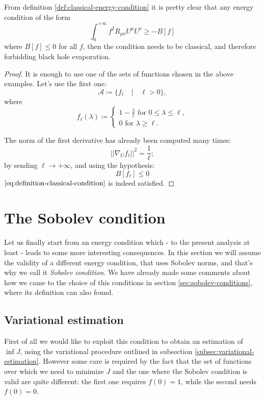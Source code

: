 	\begin{corollary}
		From definition \ref{def:classical-energy-condition} it is pretty clear that any energy condition of the form
		\[
			\int_0^{+\infty} f^2 R_{\mu\nu}U^{\mu}U^{\nu} \ge -B[f]	
		\]
		where \(B[f] \le 0\) for all \(f\), then the condition needs to be classical, and therefore forbidding black hole evaporation.
	\end{corollary}
	\begin{proof}
		It is enough to use one of the sets of functions chosen in the above examples. Let's use the first one:
		\[
		\mathcal{A} \coloneqq \{f_{\ell} \quad\vert\quad \ell >0\},
		\]
		where
		\[
			f_{\ell}(\lambda) \coloneqq
			\begin{cases}
				 1 - \frac{\lambda}{\ell} \text{ for } 0 \le \lambda \le \ell, \\	
				0 \text{ for } \lambda \ge \ell.
			\end{cases}
		\]

		The norm of the first derivative has already been computed many times:
		\[
			\vert \vert \nabla_U f_{\ell} \vert\vert^2 	= \frac{1}{\ell};
		\]
		by sending \(\ell \rightarrow +\infty\), and using the hypothesis:
		\[
			B[f_{\ell}] \le 0	
		\]
		\(\eqref{eq:definition-classical-condition}\) is indeed satisfied.
	\end{proof}

\section{The Sobolev condition}
Let us finally start from an energy condition which - to the present analysis at least - leads to some more interesting consequences.
In this section we will assume the validity of a different energy condition, that uses Sobolev norms, and that's why we call it \emph{Sobolev condition}.
We have already made some comments about how we came to the choice of this conditions in section \ref{sec:sobolev-conditions}, where its definition can also found.

\subsection{Variational estimation}
\label{subsec:V-optimization}

First of all we would like to exploit this condition to obtain an estimation of \(\inf J\), using the variational procedure outlined in subsection \ref{subsec:variational-estimation}. However some care is required by the fact that the set of functions over which we need to minimize \(J\) and the one where the Sobolev condition is valid are quite different: the first one requires \(f(0) = 1\), while the second needs \(f(0) = 0\).

